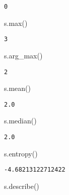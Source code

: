 \documentclass[
  letterpaper,
  DIV=11,
  numbers=noendperiod]{scrartcl}
\newenvironment{Shaded}{\begin{snugshade}}{\end{snugshade}}
\newcommand{\BuiltInTok}[1]{\textcolor[rgb]{0.00,0.23,0.31}{#1}}
\newcommand{\NormalTok}[1]{\textcolor[rgb]{0.00,0.23,0.31}{#1}}
\begin{document}
\begin{verbatim}
0
\end{verbatim}

\begin{Shaded}
\begin{Highlighting}[]
\NormalTok{s.}\BuiltInTok{max}\NormalTok{()}
\end{Highlighting}
\end{Shaded}

\begin{verbatim}
3
\end{verbatim}

\begin{Shaded}
\begin{Highlighting}[]
\NormalTok{s.arg\_max()}
\end{Highlighting}
\end{Shaded}

\begin{verbatim}
2
\end{verbatim}

\begin{Shaded}
\begin{Highlighting}[]
\NormalTok{s.mean()}
\end{Highlighting}
\end{Shaded}

\begin{verbatim}
2.0
\end{verbatim}

\begin{Shaded}
\begin{Highlighting}[]
\NormalTok{s.median()}
\end{Highlighting}
\end{Shaded}

\begin{verbatim}
2.0
\end{verbatim}

\begin{Shaded}
\begin{Highlighting}[]
\NormalTok{s.entropy()}
\end{Highlighting}
\end{Shaded}

\begin{verbatim}
-4.68213122712422
\end{verbatim}

\begin{Shaded}
\begin{Highlighting}[]
\NormalTok{s.describe()}
\end{Highlighting}
\end{Shaded}
\end{document}
